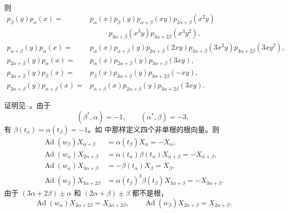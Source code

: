 {\begin{enumerate}
\[\begin{aligned}
    \end{aligned}
    \]
    则
    \[
    \begin{aligned}
      p_\beta(y)p_\alpha(x)
        ={}&p_\alpha(x)p_\beta(y)p_{\alpha+\beta}(xy)
          p_{2\alpha+\beta}(x^2y)\\
        &\qquad{}\cdot p_{3\alpha+\beta}(x^3y)
          p_{3\alpha+2\beta}(x^3y^2),\\
      p_{\alpha+\beta}(y)p_\alpha(x)
        ={}&p_\alpha(x)p_{\alpha+\beta}(y)
          p_{2\alpha+\beta}(2xy)p_{3\alpha+\beta}(3x^2y)
          p_{3\alpha+2\beta}(3xy^2),\\
      p_{2\alpha+\beta}(y)p_\alpha(x)
        ={}&p_\alpha(x)p_{2\alpha+\beta}(y)
          p_{3\alpha+\beta}(3xy),\\
      p_{3\alpha+\beta}(y)p_\beta(x)
        ={}&p_\beta(x)p_{3\alpha+\beta}(y)
          p_{3\alpha+2\beta}(-xy),\\
      p_{2\alpha+\beta}(y)p_{\alpha+\beta}(x)
        ={}&p_{\alpha+\beta}(x)p_{2\alpha+\beta}(y)
          p_{3\alpha+2\beta}(3xy).
    \end{aligned}
    \]
\end{enumerate}}

证明见--。由于
\[
  (\beta^*,\alpha)=-1,\qquad(\alpha^*,\beta)=-3,
\]
有 \(\beta(t_\alpha)=\alpha(t_\beta)=-1\)。如 中那样定义四个非单根的根向量。则
\[
\begin{aligned}
  \operatorname{Ad}(w_\beta)X_{\alpha+\beta}
    &=\alpha(t_\beta)X_\alpha=-X_\alpha,\\
  \operatorname{Ad}(w_\alpha)X_{2\alpha+\beta}
    &=\alpha(t_\alpha)\beta(t_\alpha)X_{\alpha+\beta}
      =-X_{\alpha+\beta},\\
  \operatorname{Ad}(w_\alpha)X_{3\alpha+\beta}
    &=-\beta(t_\alpha)X_\beta=X_\beta,\\
  \operatorname{Ad}(w_\beta)X_{3\alpha+2\beta}
    &=\alpha(t_\beta)^3\beta(t_\beta)X_{3\alpha+\beta}
      =-X_{3\alpha+\beta}.
\end{aligned}
\]
由于 \((3\alpha+2\beta)\pm\alpha\) 和 \((2\alpha+\beta)\pm\beta\) 都不是根，
\[
  \operatorname{Ad}(w_\alpha)X_{3\alpha+2\beta}=X_{3\alpha+2\beta},
  \qquad
  \operatorname{Ad}(w_\beta)X_{2\alpha+\beta}=X_{2\alpha+\beta}.
\]


